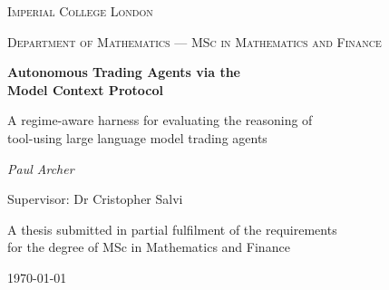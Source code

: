 \documentclass[11pt,a4paper,oneside]{report}
\begin{document}
\begin{titlepage}
  \centering
  \vspace*{1.5cm}
  {\scshape\large Imperial College London\par}
  {\scshape Department of Mathematics --- MSc in Mathematics and Finance\par}
  \vspace{2.2cm}
  {\huge\bfseries Autonomous Trading Agents via the\\[0.3em] Model Context Protocol\par}
  \vspace{1.0cm}
  {\large A regime-aware harness for evaluating the reasoning of\\
   tool-using large language model trading agents\par}
  \vspace{2.4cm}
  {\large\itshape Paul Archer\par}
  \vspace{0.6cm}
  {\large Supervisor: Dr Cristopher Salvi\par}
  \vfill
  {\large A thesis submitted in partial fulfilment of the requirements\\
   for the degree of MSc in Mathematics and Finance\par}
  \vspace{0.8cm}
  {\large \today\par}
\end{titlepage}





\tableofcontents
\listoffigures
\listoftables


\cleardoublepage
{}










\printbibliography[heading=bibintoc]

\appendix

\end{document}
